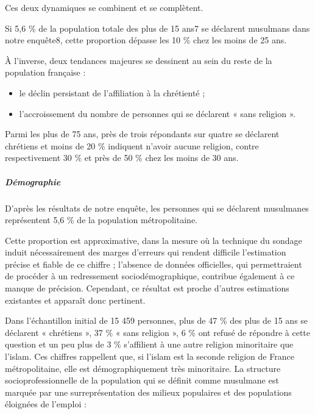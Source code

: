 Ces deux dynamiques se combinent et se complètent.

Si 5,6 \% de la population totale des plus de 15 ans7 se déclarent
musulmans dans notre enquête8, cette proportion dépasse les 10 \% chez
les moins de 25 ans.

À l'inverse, deux tendances majeures se dessinent au sein du reste de la
population française :


\begin{itemize}
\item
  
  le déclin persistant de l'affiliation à la chrétienté ;
  
\item
  
  l'accroissement du nombre de personnes qui se déclarent « sans
  religion ».
  
\end{itemize}


Parmi les plus de 75 ans, près de trois répondants sur quatre se
déclarent chrétiens et moins de 20 \% indiquent n'avoir aucune religion,
contre respectivement 30 \% et près de 50 \% chez les moins de 30 ans.


\hypertarget{duxe9mographie}{%
\subparagraph{Démographie}\label{duxe9mographie}}


D'après les résultats de notre enquête, les personnes qui se déclarent
musulmanes représentent 5,6 \% de la population métropolitaine.

Cette proportion est approximative, dans la mesure où la technique du
sondage induit nécessairement des marges d'erreurs qui rendent difficile
l'estimation précise et fiable de ce chiffre ; l'absence de données
officielles, qui permettraient de procéder à un redressement
sociodémographique, contribue également à ce manque de
précision. Cependant, ce résultat est proche d'autres estimations
existantes et apparaît donc pertinent.

Dans l'échantillon initial de 15 459 personnes, plus de 47 \% des plus
de 15 ans se déclarent « chrétiens », 37 \% « sans religion », 6 \% ont
refusé de répondre à cette question et un peu plus de 3 \% s'affilient à
une autre religion minoritaire que l'islam. Ces chiffres rappellent que,
si l'islam est la seconde religion de France métropolitaine, elle est
démographiquement très minoritaire. La structure socioprofessionnelle
de la population qui se définit comme musulmane est marquée par une
surreprésentation des milieux populaires et des populations éloignées de
l'emploi :


